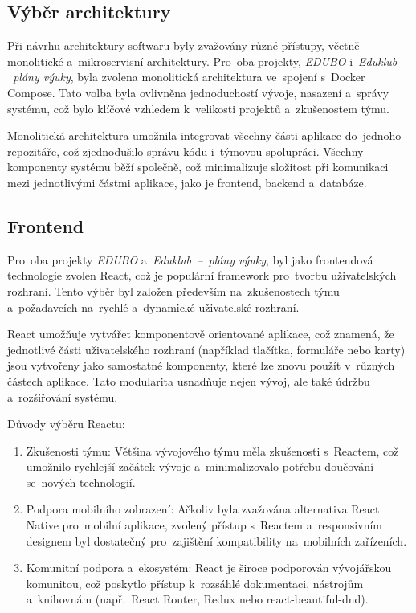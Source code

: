 \documentclass[male,czech,api_bc]{kitheses}
\begin{document}
\subsection{Výběr architektury}

Při návrhu architektury softwaru byly zvažovány různé přístupy, včetně monolitické a~mikroservisní architektury. Pro~oba projekty, \textit{EDUBO} i~\textit{Eduklub~--~plány výuky}, byla zvolena monolitická architektura ve~spojení s~Docker Compose. Tato volba byla ovlivněna jednoduchostí vývoje, nasazení a~správy systému, což bylo klíčové vzhledem k~velikosti projektů a~zkušenostem týmu.

Monolitická architektura umožnila integrovat všechny části aplikace do~jednoho repozitáře, což zjednodušilo správu kódu i~týmovou spolupráci. Všechny komponenty systému běží společně, což minimalizuje složitost při komunikaci mezi jednotlivými částmi aplikace, jako je frontend, backend a~databáze.

\subsection{Frontend}

Pro~oba projekty \textit{EDUBO} a~\textit{Eduklub~--~plány výuky}, byl jako frontendová technologie zvolen React, což je populární framework pro~tvorbu uživatelských rozhraní. Tento výběr byl založen především na~zkušenostech týmu a~požadavcích na~rychlé a~dynamické uživatelské rozhraní.

React umožňuje vytvářet komponentově orientované aplikace, což znamená, že jednotlivé části uživatelského rozhraní (například tlačítka, formuláře nebo karty) jsou vytvořeny jako samostatné komponenty, které lze znovu použít v~různých částech aplikace. Tato modularita usnadňuje nejen vývoj, ale také údržbu a~rozšiřování systému.

Důvody výběru Reactu:
\begin{enumerate}
	\item Zkušenosti týmu: Většina vývojového týmu měla zkušenosti s~Reactem, což umožnilo rychlejší začátek vývoje a~minimalizovalo potřebu doučování se~nových technologií.
	\item Podpora mobilního zobrazení: Ačkoliv byla zvažována alternativa React Native pro~mobilní aplikace, zvolený přístup s~Reactem a~responsivním designem byl dostatečný pro~zajištění kompatibility na~mobilních zařízeních.
	\item Komunitní podpora a~ekosystém: React je široce podporován vývojářskou komunitou, což poskytlo přístup k~rozsáhlé dokumentaci, nástrojům a~knihovnám (např.~React Router, Redux nebo react-beautiful-dnd).
\end{enumerate}
\end{document}
